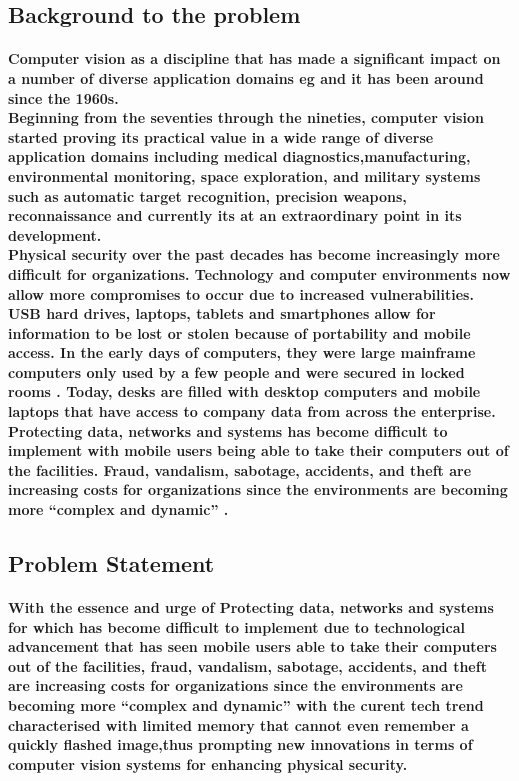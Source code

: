 \documentclass[11pt]{article}
\begin{document}
	 \subsection{\textbf{Background to the problem}}
	  \paragraph{\textmd{Computer vision as a discipline that has made
	 a significant impact on a number of diverse application domains eg \cite{DUMMY:1} and it has been around since the 1960s.\\ Beginning from the seventies through the nineties, computer vision started proving its practical value in a wide range of diverse application domains including medical diagnostics,manufacturing, environmental monitoring, space exploration, and military systems such as automatic target recognition, precision weapons, reconnaissance\cite{DUMMY:3} and currently its at an extraordinary point in its development.\\Physical security over  the past decades has become increasingly more difficult for organizations. Technology and computer environments now allow more compromises to occur
	 due to increased vulnerabilities. USB hard drives, laptops, tablets and smartphones allow for information to be lost or stolen because of portability and mobile access. In the early days of
	 computers, they were large mainframe computers only used by a few people and were secured in locked rooms \cite{DUMMY:2}. Today, desks are filled with desktop computers and mobile laptops that have access to company data from across the enterprise. Protecting data, networks and systems has become difficult to implement with mobile users being able to take their computers out of the facilities. Fraud, vandalism, sabotage, accidents, and theft are increasing costs for organizations since the environments are becoming more “complex and dynamic” \cite{DUMMY:2}.}}
	  
	 \subsection{\textbf{Problem Statement}}
	 
	 \paragraph{\textmd{With the essence and urge of Protecting data, networks and systems for which has become difficult to implement due to technological advancement that has seen mobile users able to take their computers out of the facilities, fraud, vandalism, sabotage, accidents, and theft are increasing costs for organizations since the environments are becoming more “complex and dynamic” with the curent tech trend characterised with limited memory that cannot even remember a quickly flashed image,thus prompting new innovations in terms of computer vision systems for enhancing physical security.}}
	 
\end{document}
